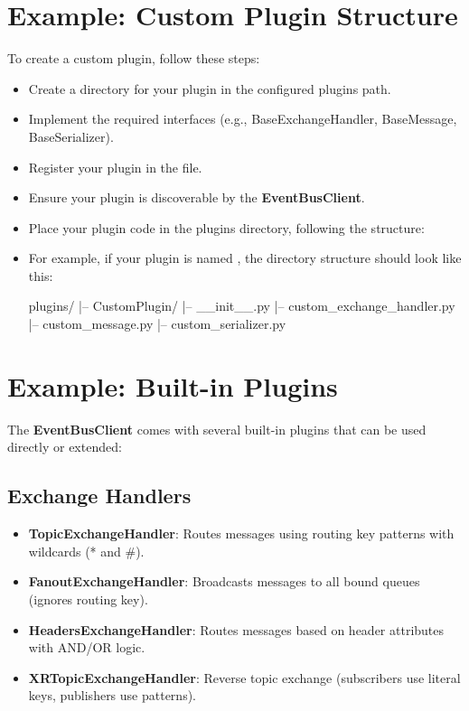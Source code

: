 \section{Example: Custom Plugin Structure}\label{sec:example:-custom-plugin-structure}
To create a custom plugin, follow these steps:
\begin{itemize}
  \item Create a directory for your plugin in the configured plugins path.
  \item Implement the required interfaces (e.g., BaseExchangeHandler, BaseMessage, BaseSerializer).
  \item Register your plugin in the  file.
  \item Ensure your plugin is discoverable by the \textbf{EventBusClient}.
  \item Place your plugin code in the plugins directory, following the structure:
  \item For example, if your plugin is named , the directory structure should look like this:
        \begin{pythonlog}
plugins/
|-- CustomPlugin/
    |-- __init__.py
    |-- custom_exchange_handler.py
    |-- custom_message.py
    |-- custom_serializer.py\end{pythonlog}
\end{itemize}
\section{Example: Built-in Plugins}
The \textbf{EventBusClient} comes with several built-in plugins that can be used directly or extended:

\subsection*{Exchange Handlers}
\begin{itemize}
  \item \textbf{TopicExchangeHandler}: Routes messages using routing key patterns with wildcards (* and \#).
  \item \textbf{FanoutExchangeHandler}: Broadcasts messages to all bound queues (ignores routing key).
  \item \textbf{HeadersExchangeHandler}: Routes messages based on header attributes with AND/OR logic.
  \item \textbf{XRTopicExchangeHandler}: Reverse topic exchange (subscribers use literal keys, publishers use patterns).
\end{itemize}

